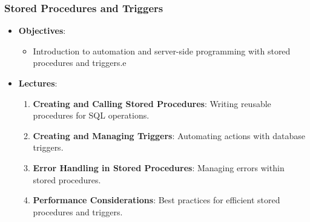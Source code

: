 \documentclass[
  letterpaper,
  DIV=11,
  numbers=noendperiod]{scrartcl}
\providecommand{\tightlist}{%
  \setlength{\itemsep}{0pt}\setlength{\parskip}{0pt}}\usepackage{longtable,booktabs,array}
\begin{document}
\subsubsection{Stored Procedures and
Triggers}\label{stored-procedures-and-triggers}

\begin{itemize}
\tightlist
\item
  \textbf{Objectives}:

  \begin{itemize}
  \tightlist
  \item
    Introduction to automation and server-side programming with stored
    procedures and triggers.e
  \end{itemize}
\item
  \textbf{Lectures}:

  \begin{enumerate}
  \def\labelenumi{\arabic{enumi}.}
  \tightlist
  \item
    \textbf{Creating and Calling Stored Procedures}: Writing reusable
    procedures for SQL operations.
  \item
    \textbf{Creating and Managing Triggers}: Automating actions with
    database triggers.
  \item
    \textbf{Error Handling in Stored Procedures}: Managing errors within
    stored procedures.
  \item
    \textbf{Performance Considerations}: Best practices for efficient
    stored procedures and triggers.
  \end{enumerate}
\end{itemize}
\end{document}
